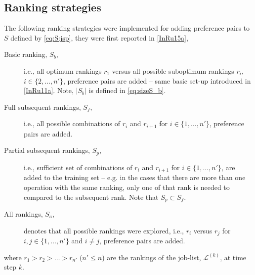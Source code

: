 \subsection{Ranking strategies}
The following ranking strategies were implemented for adding preference pairs 
to $S$ defined by \cref{eq:S:jsp}, they were first reported in \cref{InRu15a},
\begin{description}
	\item[Basic ranking, $S_b$,] i.e., all optimum rankings $r_1$ versus all 
	possible suboptimum rankings $r_i$, $i\in\{2,\ldots,n'\}$, preference pairs 
	are added -- same basic set-up introduced in \cref{InRu11a}. Note, $|S_b|$ 
	is defined in \cref{eq:sizeS_b}.
	\item[Full subsequent rankings, $S_f$,] i.e., all possible combinations of $r_i$ and $r_{i+1}$ for $i\in\{1,\ldots,n'\}$, preference pairs are added.
	\item[Partial subsequent rankings, $S_p$,] i.e., sufficient set of combinations of $r_i$ and $r_{i+1}$ for $i\in\{1,\ldots,n'\}$, are added to the training set -- e.g. in the cases that there are more than one operation with the same ranking, only one of that rank is needed to compared to the subsequent rank. Note that $S_p\subset S_f$.
	\item[All rankings, $S_a$,] denotes that all possible rankings were explored, i.e.,
	$r_i$ versus $r_j$ for $i,j\in\{1,\ldots,n'\}$ and $i\neq j$, preference pairs are added.
\end{description}
where $r_1>r_2>\ldots>r_{n'}$ ($n'\leq n$) are the rankings of the job-list, 
$\mathcal{L}^{(k)}$, at time step $k$.


